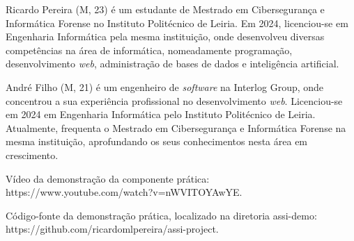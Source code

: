 \documentclass[journal]{IEEEtran}
\begin{document}
\begin{IEEEbiography}{Ricardo Pereira}
  (M, 23) é um estudante de Mestrado em Cibersegurança e Informática Forense no Instituto Politécnico de Leiria. Em 2024, licenciou-se em Engenharia Informática pela mesma instituição, onde desenvolveu diversas competências na área de informática, nomeadamente programação, desenvolvimento \textit{web}, administração de bases de dados e inteligência artificial.
\end{IEEEbiography}


\begin{IEEEbiography}{André Filho}
  (M, 21) é um engenheiro de \textit{software} na Interlog Group, onde concentrou a sua experiência profissional no desenvolvimento \textit{web}. Licenciou-se em 2024 em Engenharia Informática pelo Instituto Politécnico de Leiria. Atualmente, frequenta o Mestrado em Cibersegurança e Informática Forense na mesma instituição, aprofundando os seus conhecimentos nesta área em crescimento.
\end{IEEEbiography}

\vfill

Vídeo da demonstração da componente prática: https://www.youtube.com/watch?v=nWVITOYAwYE.


Código-fonte da demonstração prática, localizado na diretoria assi-demo: https://github.com/ricardomlpereira/assi-project.




\end{document}
